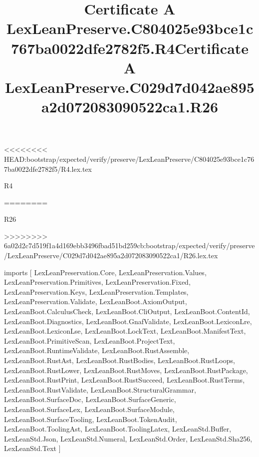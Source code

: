 <<<<<<<< HEAD:bootstrap/expected/verify/preserve/LexLeanPreserve/C804025e93bce1c767ba0022dfe2782f5/R4.lex.tex
\begin{lexlean}{R4}
\title{Certificate A LexLeanPreserve.C804025e93bce1c767ba0022dfe2782f5.R4}
========
\begin{lexlean}{R26}
\title{Certificate A LexLeanPreserve.C029d7d042ae895a2d072083090522ca1.R26}
>>>>>>>> 6a02d2c7d519f1a4d169ebb3496fbad51bd259cb:bootstrap/expected/verify/preserve/LexLeanPreserve/C029d7d042ae895a2d072083090522ca1/R26.lex.tex
\begin{coremodule}
imports [
  LexLeanPreservation.Core,
  LexLeanPreservation.Values,
  LexLeanPreservation.Primitives,
  LexLeanPreservation.Fixed,
  LexLeanPreservation.Keys,
  LexLeanPreservation.Templates,
  LexLeanPreservation.Validate,
  LexLeanBoot.AxiomOutput,
  LexLeanBoot.CalculusCheck,
  LexLeanBoot.CliOutput,
  LexLeanBoot.ContentId,
  LexLeanBoot.Diagnostics,
  LexLeanBoot.GnafValidate,
  LexLeanBoot.LexiconLre,
  LexLeanBoot.LexiconLse,
  LexLeanBoot.LockText,
  LexLeanBoot.ManifestText,
  LexLeanBoot.PrimitiveScan,
  LexLeanBoot.ProjectText,
  LexLeanBoot.RuntimeValidate,
  LexLeanBoot.RustAssemble,
  LexLeanBoot.RustAst,
  LexLeanBoot.RustBodies,
  LexLeanBoot.RustLoops,
  LexLeanBoot.RustLower,
  LexLeanBoot.RustMoves,
  LexLeanBoot.RustPackage,
  LexLeanBoot.RustPrint,
  LexLeanBoot.RustSucceed,
  LexLeanBoot.RustTerms,
  LexLeanBoot.RustValidate,
  LexLeanBoot.StructuralGrammar,
  LexLeanBoot.SurfaceDoc,
  LexLeanBoot.SurfaceGeneric,
  LexLeanBoot.SurfaceLex,
  LexLeanBoot.SurfaceModule,
  LexLeanBoot.SurfaceTooling,
  LexLeanBoot.TokenAudit,
  LexLeanBoot.ToolingAst,
  LexLeanBoot.ToolingLatex,
  LexLeanStd.Buffer,
  LexLeanStd.Json,
  LexLeanStd.Numeral,
  LexLeanStd.Order,
  LexLeanStd.Sha256,
  LexLeanStd.Text
]


\end{coremodule}
\end{lexlean}
\end{lexlean}
